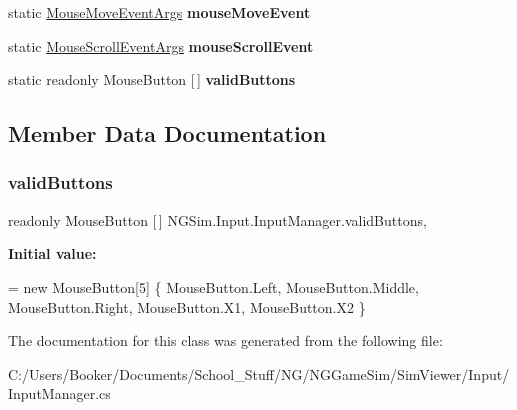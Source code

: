 \begin{DoxyCompactItemize}
static \hyperlink{struct_n_g_sim_1_1_input_1_1_input_manager_1_1_mouse_move_event_args}{Mouse\+Move\+Event\+Args} {\bfseries mouse\+Move\+Event}
\item 
\mbox{\label{class_n_g_sim_1_1_input_1_1_input_manager_abb3e1c24e6d54f730ae46453bbcb95f2}} 
static \hyperlink{struct_n_g_sim_1_1_input_1_1_input_manager_1_1_mouse_scroll_event_args}{Mouse\+Scroll\+Event\+Args} {\bfseries mouse\+Scroll\+Event}
\item 
static readonly Mouse\+Button \mbox{[}$\,$\mbox{]} {\bfseries valid\+Buttons}
\end{DoxyCompactItemize}


\subsection{Member Data Documentation}
\mbox{\label{class_n_g_sim_1_1_input_1_1_input_manager_a111540f13b9eaab4b1f4dbdb48111213}} 
\subsubsection{\texorpdfstring{valid\+Buttons}{validButtons}}
{\footnotesize\ttfamily readonly Mouse\+Button \mbox{[}$\,$\mbox{]} N\+G\+Sim.\+Input.\+Input\+Manager.\+valid\+Buttons\hspace{0.3cm}{\ttfamily [static]}, {\ttfamily [private]}}

{\bfseries Initial value\+:}
\begin{DoxyCode}
= \textcolor{keyword}{new} MouseButton[5]
            \{ MouseButton.Left, MouseButton.Middle, MouseButton.Right, MouseButton.X1, MouseButton.X2 \}
\end{DoxyCode}


The documentation for this class was generated from the following file\+:\begin{DoxyCompactItemize}
\item 
C\+:/\+Users/\+Booker/\+Documents/\+School\+\_\+\+Stuff/\+N\+G/\+N\+G\+Game\+Sim/\+Sim\+Viewer/\+Input/Input\+Manager.\+cs\end{DoxyCompactItemize}
